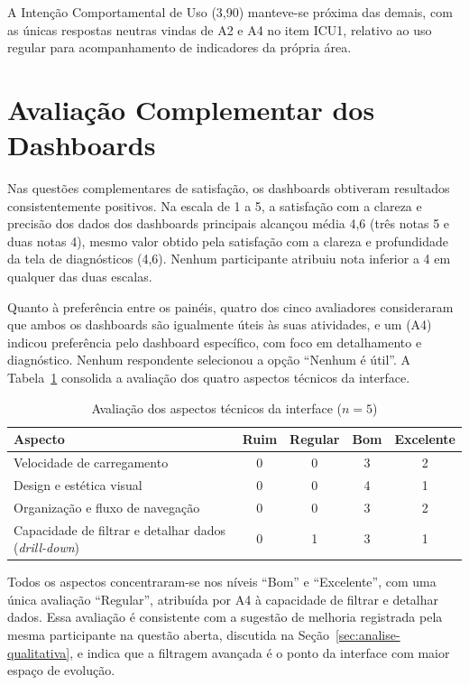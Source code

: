 A Intenção Comportamental de Uso (3,90) manteve-se próxima das demais, com as únicas respostas neutras vindas de A2 e A4 no item ICU1, relativo ao uso regular para acompanhamento de indicadores da própria área.

\section{Avaliação Complementar dos Dashboards}
\label{sec:avaliacao-complementar}

Nas questões complementares de satisfação, os dashboards obtiveram resultados consistentemente positivos. Na escala de 1 a 5, a satisfação com a clareza e precisão dos dados dos dashboards principais alcançou média 4,6 (três notas 5 e duas notas 4), mesmo valor obtido pela satisfação com a clareza e profundidade da tela de diagnósticos (4,6). Nenhum participante atribuiu nota inferior a 4 em qualquer das duas escalas.

Quanto à preferência entre os painéis, quatro dos cinco avaliadores consideraram que ambos os dashboards são igualmente úteis às suas atividades, e um (A4) indicou preferência pelo dashboard específico, com foco em detalhamento e diagnóstico. Nenhum respondente selecionou a opção ``Nenhum é útil''. A Tabela~\ref{tab:aspectos-interface} consolida a avaliação dos quatro aspectos técnicos da interface.

\begin{table}[h!]
    \centering
    \caption{Avaliação dos aspectos técnicos da interface ($n=5$)}
    \label{tab:aspectos-interface}
    \begin{tabular}{lcccc}
        \hline
        \textbf{Aspecto} & \textbf{Ruim} & \textbf{Regular} & \textbf{Bom} & \textbf{Excelente} \\
        \hline
        Velocidade de carregamento & 0 & 0 & 3 & 2 \\
        Design e estética visual & 0 & 0 & 4 & 1 \\
        Organização e fluxo de navegação & 0 & 0 & 3 & 2 \\
        Capacidade de filtrar e detalhar dados (\textit{drill-down}) & 0 & 1 & 3 & 1 \\
        \hline
    \end{tabular}
\end{table}

Todos os aspectos concentraram-se nos níveis ``Bom'' e ``Excelente'', com uma única avaliação ``Regular'', atribuída por A4 à capacidade de filtrar e detalhar dados. Essa avaliação é consistente com a sugestão de melhoria registrada pela mesma participante na questão aberta, discutida na Seção~\ref{sec:analise-qualitativa}, e indica que a filtragem avançada é o ponto da interface com maior espaço de evolução.

